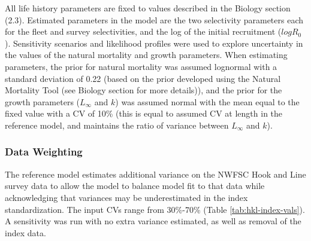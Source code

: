 \documentclass[11pt,
  english,
  a4paper,
]{article}
\begin{document}

All life history parameters are fixed to values described in the Biology section (2.3). Estimated parameters in the model are the two selectivity parameters each for the fleet and survey selectivities, and the log of the initial recruitment ({\(logR_0\)\leavevmode\tagmcend\tagstructend}). Sensitivity scenarios and likelihood profiles were used to explore uncertainty in the values of the natural mortality and growth parameters. When estimating parameters, the prior for natural mortality was assumed lognormal with a standard deviation of 0.22 (based on the prior developed using the Natural Mortality Tool (see Biology section for more details)), and the prior for the growth parameters ({\(L_{\infty}\)\leavevmode\tagmcend\tagstructend} and {\(k\)\leavevmode\tagmcend\tagstructend}) was assumed normal with the mean equal to the fixed value with a CV of 10\% (this is equal to assumed CV at length in the reference model, and maintains the ratio of variance between {\(L_{\infty}\)\leavevmode\tagmcend\tagstructend} and {\(k\)\leavevmode\tagmcend\tagstructend}).

\leavevmode\tagmcend\tagstructend\par


\hypertarget{data-weighting}{%
\subsubsection{Data Weighting}\label{data-weighting}}

\leavevmode\tagmcend\tagstructend


The reference model estimates additional variance on the NWFSC Hook and Line survey data to allow the model to balance model fit to that data while acknowledging that variances may be underestimated in the index standardization. The input CVs range from 30\%-70\% (Table \ref{tab:hkl-index-vals}). A sensitivity was run with no extra variance estimated, as well as removal of the index data.

\leavevmode\tagmcend\tagstructend\par
\end{document}

